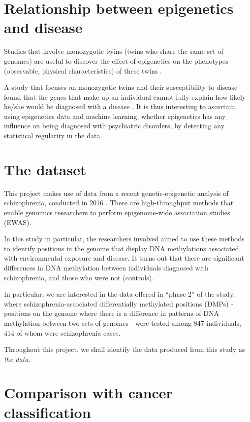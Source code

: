 \documentclass[12pt, twoside, a4paper]{report}
\begin{document}
\section{Relationship between epigenetics and disease} \label{bg_epigenetics}
Studies that involve monozygotic twins (twins who share the same set of genomes) are useful to discover the effect of epigenetics on the phenotypes (observable, physical characteristics) of these twins \cite{RefWorks:104}.

A study that focuses on monozygotic twins and their susceptibility to disease found that the genes that make up an individual cannot fully explain how likely he/she would be diagnosed with a disease \cite{RefWorks:105}. It is thus interesting to ascertain, using epigenetics data and machine learning, whether epigenetics has any influence on being diagnosed with psychiatric disorders, by detecting any statistical regularity in the data.

\section{The dataset} \label{bg_genetic_data}
This project makes use of data from a recent genetic-epigenetic analysis of schizophrenia, conducted in 2016 \cite{RefWorks:78}. There are high-throughput methods that enable genomics researchers to perform epigenome-wide association studies (EWAS).

In this study in particular, the researchers involved aimed to use these methods to identify positions in the genome that display DNA methylations associated with environmental exposure and disease. It turns out that there are significant differences in DNA methylation between individuals diagnosed with schizophrenia, and those who were not (controls).

In particular, we are interested in the data offered in ``phase 2'' of the study, where schizophrenia-associated differentially methylated positions (DMPs) - positions on the genome where there is a difference in patterns of DNA methylation between two sets of genomes - were tested among 847 individuals, 414 of whom were schizophrenia cases.

Throughout this project, we shall identify the data produced from this study as \textit{the data}.

\section{Comparison with cancer classification} \label{bg:cancer}
\end{document}
